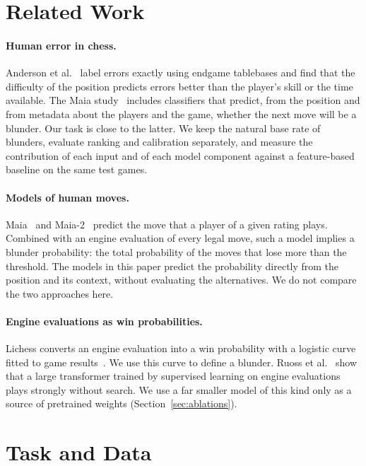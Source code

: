 \documentclass[11pt]{article}
\begin{document}
\section{Related Work}
\label{sec:related}

\paragraph{Human error in chess.}
Anderson et al.~\cite{humanerror} label errors exactly using endgame
tablebases and find that the difficulty of the position predicts errors
better than the player's skill or the time available. The Maia
study~\cite{maia} includes classifiers that predict, from the position and
from metadata about the players and the game, whether the next move will be a
blunder. Our task is close to the latter. We keep the natural base rate of
blunders, evaluate ranking and calibration separately, and measure the
contribution of each input and of each model component against a
feature-based baseline on the same test games.

\paragraph{Models of human moves.}
Maia~\cite{maia} and Maia-2~\cite{maia2} predict the move that a player of a
given rating plays. Combined with an engine evaluation of every legal move,
such a model implies a blunder probability: the total probability of the
moves that lose more than the threshold. The models in this paper predict the
probability directly from the position and its context, without evaluating
the alternatives. We do not compare the two approaches here.

\paragraph{Engine evaluations as win probabilities.}
Lichess converts an engine evaluation into a win probability with a logistic
curve fitted to game results~\cite{lichessaccuracy,lilawinchances}. We use
this curve to define a blunder. Ruoss et al.~\cite{searchless} show that a
large transformer trained by supervised learning on engine evaluations plays
strongly without search. We use a far smaller model of this kind only as a
source of pretrained weights (Section~\ref{sec:ablations}).

\section{Task and Data}
\label{sec:data}
\end{document}
